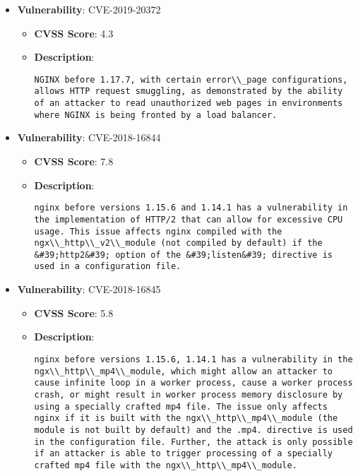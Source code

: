 \documentclass{article}
\begin{document}
\begin{itemize}
        \item \textbf{Vulnerability}: CVE-2019-20372
        \begin{itemize}
            \item \textbf{CVSS Score}:  4.3 
            \item \textbf{Description}:
            \parbox[t]{0.9\linewidth}{
                \verb|NGINX before 1.17.7, with certain error\\_page configurations, allows HTTP request smuggling, as demonstrated by the ability of an attacker to read unauthorized web pages in environments where NGINX is being fronted by a load balancer.|
            }
        \end{itemize}
    
        \item \textbf{Vulnerability}: CVE-2018-16844
        \begin{itemize}
            \item \textbf{CVSS Score}:  7.8 
            \item \textbf{Description}:
            \parbox[t]{0.9\linewidth}{
                \verb|nginx before versions 1.15.6 and 1.14.1 has a vulnerability in the implementation of HTTP/2 that can allow for excessive CPU usage. This issue affects nginx compiled with the ngx\\_http\\_v2\\_module (not compiled by default) if the &#39;http2&#39; option of the &#39;listen&#39; directive is used in a configuration file.|
            }
        \end{itemize}
    
        \item \textbf{Vulnerability}: CVE-2018-16845
        \begin{itemize}
            \item \textbf{CVSS Score}:  5.8 
            \item \textbf{Description}:
            \parbox[t]{0.9\linewidth}{
                \verb|nginx before versions 1.15.6, 1.14.1 has a vulnerability in the ngx\\_http\\_mp4\\_module, which might allow an attacker to cause infinite loop in a worker process, cause a worker process crash, or might result in worker process memory disclosure by using a specially crafted mp4 file. The issue only affects nginx if it is built with the ngx\\_http\\_mp4\\_module (the module is not built by default) and the .mp4. directive is used in the configuration file. Further, the attack is only possible if an attacker is able to trigger processing of a specially crafted mp4 file with the ngx\\_http\\_mp4\\_module.|
            }
        \end{itemize}
    
\end{itemize}
\end{document}
